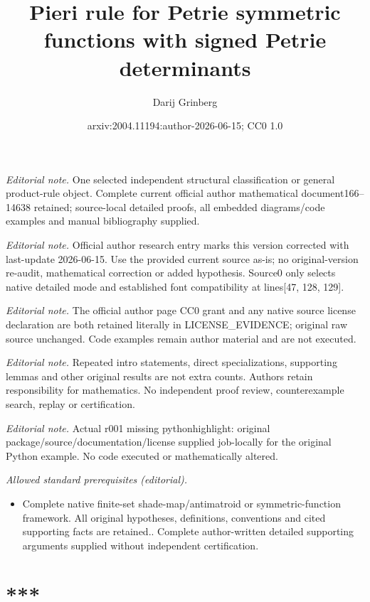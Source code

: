 \documentclass[numbers=enddot,12pt,final,onecolumn,notitlepage]{scrartcl}%
\title{Pieri rule for Petrie symmetric functions with signed Petrie determinants}
\author{Darij Grinberg}
\date{arxiv:2004.11194:author-2026-06-15; CC0 1.0}
\theoremstyle{definition}
\begin{document}
\maketitle
\noindent\textit{Editorial note.} One selected independent structural classification or general product-rule object. Complete current official author mathematical document166--14638 retained; source-local detailed proofs, all embedded diagrams/code examples and manual bibliography supplied.\par\medskip
\noindent\textit{Editorial note.} Official author research entry marks this version corrected with last-update 2026-06-15. Use the provided current source as-is; no original-version re-audit, mathematical correction or added hypothesis. Source0 only selects native detailed mode and established font compatibility at lines[47, 128, 129].\par\medskip
\noindent\textit{Editorial note.} The official author page CC0 grant and any native source license declaration are both retained literally in LICENSE\_EVIDENCE; original raw source unchanged. Code examples remain author material and are not executed.\par\medskip
\noindent\textit{Editorial note.} Repeated intro statements, direct specializations, supporting lemmas and other original results are not extra counts. Authors retain responsibility for mathematics. No independent proof review, counterexample search, replay or certification.\par\medskip
\noindent\textit{Editorial note.} Actual r001 missing pythonhighlight: original package/source/documentation/license supplied job-locally for the original Python example. No code executed or mathematically altered.\par\medskip
\noindent\textit{Allowed standard prerequisites (editorial).}\begin{itemize}
\item Complete native finite-set shade-map/antimatroid or symmetric-function framework. All original hypotheses, definitions, conventions and cited supporting facts are retained.. Complete author-written detailed supporting arguments supplied without independent certification.
\end{itemize}\medskip
\section*{***}
\end{document}

